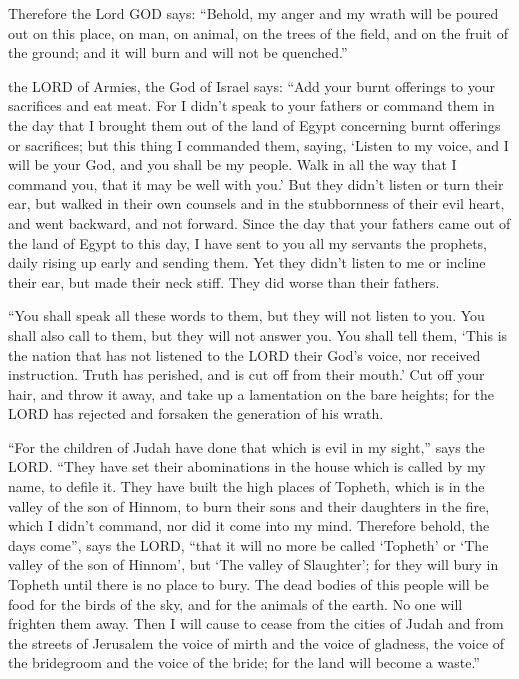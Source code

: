  Therefore the Lord GOD says: ``Behold, my anger and my
wrath will be poured out on this place, on man, on animal, on the trees
of the field, and on the fruit of the ground; and it will burn and will
not be quenched.''

 the LORD of Armies, the God of Israel says: ``Add your
burnt offerings to your sacrifices and eat meat.  For I
didn't speak to your fathers or command them in the day that I brought
them out of the land of Egypt concerning burnt offerings or sacrifices;
 but this thing I commanded them, saying, `Listen to my
voice, and I will be your God, and you shall be my people. Walk in all
the way that I command you, that it may be well with you.' 
But they didn't listen or turn their ear, but walked in their own
counsels and in the stubbornness of their evil heart, and went backward,
and not forward.  Since the day that your fathers came out
of the land of Egypt to this day, I have sent to you all my servants the
prophets, daily rising up early and sending them.  Yet they
didn't listen to me or incline their ear, but made their neck stiff.
They did worse than their fathers.

 ``You shall speak all these words to them, but they will
not listen to you. You shall also call to them, but they will not answer
you.  You shall tell them, `This is the nation that has not
listened to the LORD their God's voice, nor received instruction. Truth
has perished, and is cut off from their mouth.'  Cut off
your hair, and throw it away, and take up a lamentation on the bare
heights; for the LORD has rejected and forsaken the generation of his
wrath.

 ``For the children of Judah have done that which is evil
in my sight,'' says the LORD. ``They have set their abominations in the
house which is called by my name, to defile it.  They have
built the high places of Topheth, which is in the valley of the son of
Hinnom, to burn their sons and their daughters in the fire, which I
didn't command, nor did it come into my mind.  Therefore
behold, the days come'', says the LORD, ``that it will no more be called
`Topheth' or `The valley of the son of Hinnom', but `The valley of
Slaughter'; for they will bury in Topheth until there is no place to
bury.  The dead bodies of this people will be food for the
birds of the sky, and for the animals of the earth. No one will frighten
them away.  Then I will cause to cease from the cities of
Judah and from the streets of Jerusalem the voice of mirth and the voice
of gladness, the voice of the bridegroom and the voice of the bride; for
the land will become a waste.''

